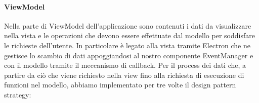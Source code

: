 			\paragraph{ViewModel}
			Nella parte di ViewModel dell'applicazione sono contenuti i dati da visualizzare nella vista e le operazioni che devono essere effettuate dal modello per soddisfare le richieste dell'utente. In particolare è legato alla vista tramite Electron che ne gestisce lo scambio di dati appoggiandosi al nostro componente EventManager e con il modello tramite il meccanismo di callback.
			Per il process dei dati che, a partire da ciò che viene richiesto nella view fino alla richiesta di esecuzione di funzioni nel modello, abbiamo implementato per tre volte il design pattern strategy:
	